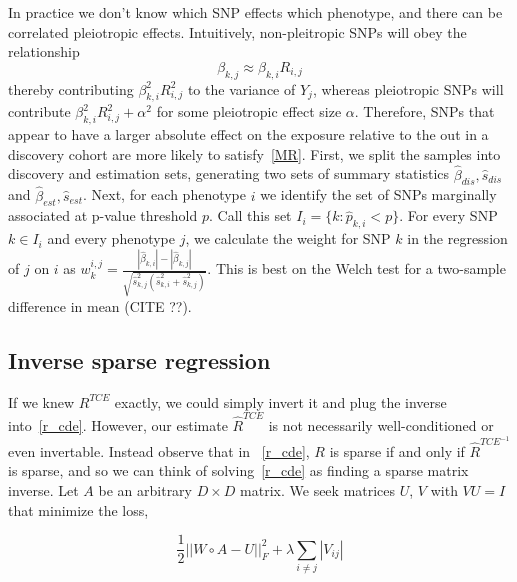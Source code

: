 \documentclass{article}
\begin{document}
In practice we don't know which SNP effects which phenotype,
and there can be correlated pleiotropic effects.
Intuitively, non-pleitropic SNPs will obey the relationship
\begin{equation}\label{MR}
\beta_{k,j} \approx \beta_{k,i} R_{i,j}
\end{equation}
thereby contributing
$\beta_{k, i}^2 R_{i, j}^2$ to the variance of $Y_j$, whereas
pleiotropic SNPs will contribute $\beta_{k, i}^2 R_{i, j}^2 + \alpha^2$
for some pleiotropic effect size $\alpha$. Therefore, SNPs that appear to
have a larger absolute effect on the exposure relative to the out in a discovery 
cohort are more likely to satisfy~\ref{MR}.
 First, we split the samples
 into discovery and estimation sets, generating
two sets of summary statistics $\hat{\beta}_{dis}, \hat{s}_{dis}$ and
$\hat{\beta}_{est}, \hat{s}_{est}$. Next, for each
phenotype $i$ we identify the set of SNPs marginally associated at p-value threshold $p$.
Call this set $I_i = \{k: \hat{p}_{k, i} < p\}$. For every SNP $k \in I_i$ and
every phenotype $j$, we calculate the  weight for SNP $k$ in the regression of $j$ on $i$ as
$w^{i,j}_k = \frac{|\hat{\beta}_{k, i}| - |\hat{\beta}_{k, j}|}
  {\sqrt{\hat{s}_{k,j}^2 (\hat{s}^2_{k, i} + \hat{s}^2_{k, j})}}$. This
  is best on the Welch test for a two-sample difference in mean (CITE ??).
  
\subsection{Inverse sparse regression}
If we knew $R^{TCE}$ exactly, we could simply invert it and plug the inverse
into~\ref{r_cde}. However, our estimate $\hat{R}^{TCE}$ is not necessarily
well-conditioned or even invertable. Instead observe that in ~\ref{r_cde}, $R$ is
sparse if and only if $\hat{R}^{TCE^{-1}}$ is sparse, and so we can think of
solving~\ref{r_cde} as finding a sparse matrix inverse. Let $A$ be an arbitrary $D\times D$
matrix. We seek matrices $U$, $V$ with $VU=I$ that minimize the loss,

\begin{equation}
\frac{1}{2} ||W \circ A - U||_F^2 + \lambda \sum_{i\neq j}|V_{ij}|
\end{equation}
\end{document}
